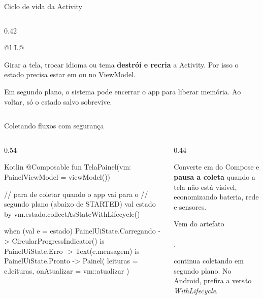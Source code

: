 \documentclass[aspectratio=169,10pt]{beamer}
\begin{document}
\begin{frame}{Ciclo de vida da Activity}
\begin{columns}[c]
\begin{column}{0.42\textwidth}
\begin{tabularx}{\linewidth}{@{}l L@{}}
        \bottomrule
      \end{tabularx}
      \begin{atencao}
        Girar a tela, trocar idioma ou tema \textbf{destrói e recria} a Activity. Por isso o estado precisa estar em  ou no ViewModel.
      \end{atencao}
      \begin{atencao}
        Em segundo plano, o sistema pode encerrar o app para liberar memória. Ao voltar, só o estado salvo sobrevive.
      \end{atencao}
    \end{column}
  \end{columns}
\end{frame}

\begin{frame}[fragile]{Coletando fluxos com segurança}
  \begin{columns}[T]
    \begin{column}{0.54\textwidth}
\begin{codigo}[title=TelaPainel.kt]{Kotlin}
@Composable
fun TelaPainel(vm: PainelViewModel = viewModel()) {
  // para de coletar quando o app vai para o
  // segundo plano (abaixo de STARTED)
  val estado by vm.estado.collectAsStateWithLifecycle()

  when (val e = estado) {
    PainelUiState.Carregando -> CircularProgressIndicator()
    is PainelUiState.Erro -> Text(e.mensagem)
    is PainelUiState.Pronto -> Painel(
      leituras = e.leituras,
      onAtualizar = vm::atualizar
    )
  }
}
\end{codigo}
    \end{column}
    \begin{column}{0.44\textwidth}
      \begin{conceito}
        Converte  em  do Compose e \textbf{pausa a coleta} quando a tela não está visível, economizando bateria, rede e sensores.
      \end{conceito}
      \begin{dica}[Dependência]
        Vem do artefato\\ \\.
      \end{dica}
      \begin{erro}
         continua coletando em segundo plano. No Android, prefira a versão \emph{WithLifecycle}.
      \end{erro}
    \end{column}
  \end{columns}
\end{frame}
\end{document}
